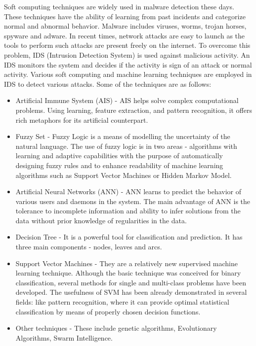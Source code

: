 \documentclass[11pt]{article}
\begin{document}
	Soft computing techniques are widely used in malware detection these days. These techniques have the ability of learning from past incidents and categorize normal and abnormal behavior. Malware includes viruses, worms, trojan horses, spyware and adware. In recent times, network attacks are easy to launch as the tools to perform such attacks are present freely on the internet. To overcome this problem, IDS (Intrusion Detection System) is used against malicious activity. An IDS monitors the system and decides if the activity is sign of an attack or normal activity. Various soft computing and machine learning techniques are employed in IDS to detect various attacks. 
	Some of the techniques are as follows:
	\begin{itemize}
		\item Artificial Immune System (AIS) - AIS helps solve complex computational problems. Using learning, feature extraction, and pattern recognition, it offers rich metaphors for its artificial counterpart.
		\item Fuzzy Set - Fuzzy Logic is a means of modelling the uncertainty of the natural language. The use of fuzzy logic is in two areas - algorithms with learning and adaptive capabilities with the purpose of automatically designing fuzzy rules and to enhance readability of machine learning algorithms such as Support Vector Machines or Hidden Markov Model.
		\item Artificial Neural Networks (ANN) - ANN learns to predict the behavior of various users and daemons in the system. The main advantage of ANN is the tolerance to incomplete information and ability to infer solutions from the data without prior knowledge of regularities in the data.
		\item Decision Tree - It is a powerful tool for classification and prediction. It has three main components - nodes, leaves and arcs.
		\item Support Vector Machines - They are a relatively new supervised machine learning technique. Although the basic technique was conceived for binary classification, several methods for single and multi-class problems have been developed. The usefulness of SVM has been already demonstrated in several fields: like pattern recognition, where it can provide optimal statistical classification by means of properly chosen decision functions.
		\item Other techniques - These include genetic algorithms, Evolutionary Algorithms, Swarm Intelligence.
	\end{itemize}
\end{document}
